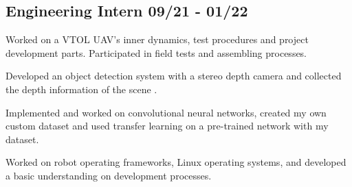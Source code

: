 \documentclass[a4paper,12pt]{article}
\begin{document}
\vspace*{6pt}
\subsection{{Engineering Intern }\hfill 09/21 - 01/22}
\begin{zitemize}
\item Worked on a VTOL UAV's inner dynamics, test procedures and project development parts. Participated in field tests and assembling processes.
\item Developed an object detection system with a stereo depth camera and collected the depth information of the scene .
\item Implemented and worked on convolutional neural networks, created my own custom dataset and used transfer learning on a pre-trained network with my dataset.
\item Worked on robot operating frameworks, Linux operating systems, and developed a basic understanding on development processes.

\end{zitemize}
\end{document}
